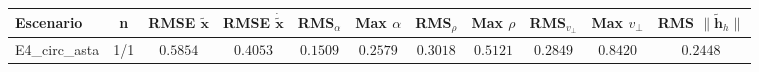 \begin{tabular}{lcccccccccc}
\toprule
Escenario & n & RMSE $\tilde{\mathbf{x}}$ & RMSE $\dot{\tilde{\mathbf{x}}}$ & RMS$_\alpha$ & Max $\alpha$ & RMS$_\rho$ & Max $\rho$ & RMS$_{v_\perp}$ & Max $v_\perp$ & RMS $\|\tilde{\mathbf{h}}_h\|$ \\
\midrule
E4\_circ\_asta & 1/1 & $0.5854$ & $0.4053$ & $0.1509$ & $0.2579$ & $0.3018$ & $0.5121$ & $0.2849$ & $0.8420$ & $0.2448$ \\
\bottomrule
\end{tabular}

